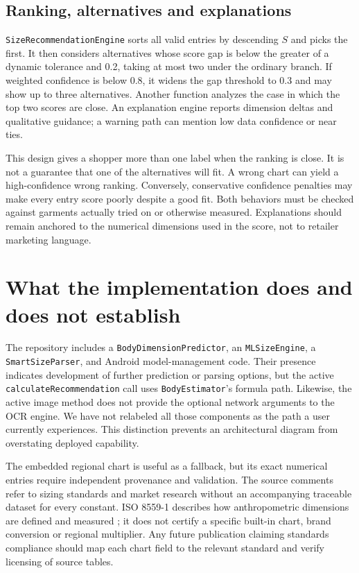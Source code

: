 \documentclass[11pt,a4paper]{article}
\begin{document}
\subsection{Ranking, alternatives and explanations}
\texttt{SizeRecommendationEngine} sorts all valid entries by descending $S$ and picks the first. It then considers alternatives whose score gap is below the greater of a dynamic tolerance and 0.2, taking at most two under the ordinary branch. If weighted confidence is below 0.8, it widens the gap threshold to 0.3 and may show up to three alternatives. Another function analyzes the case in which the top two scores are close. An explanation engine reports dimension deltas and qualitative guidance; a warning path can mention low data confidence or near ties.

This design gives a shopper more than one label when the ranking is close. It is not a guarantee that one of the alternatives will fit. A wrong chart can yield a high-confidence wrong ranking. Conversely, conservative confidence penalties may make every entry score poorly despite a good fit. Both behaviors must be checked against garments actually tried on or otherwise measured. Explanations should remain anchored to the numerical dimensions used in the score, not to retailer marketing language.

\section{What the implementation does and does not establish}
The repository includes a \texttt{BodyDimensionPredictor}, an \texttt{MLSizeEngine}, a \texttt{SmartSizeParser}, and Android model-management code. Their presence indicates development of further prediction or parsing options, but the active \texttt{calculateRecommendation} call uses \texttt{BodyEstimator}'s formula path. Likewise, the active image method does not provide the optional network arguments to the OCR engine. We have not relabeled all those components as the path a user currently experiences. This distinction prevents an architectural diagram from overstating deployed capability.

The embedded regional chart is useful as a fallback, but its exact numerical entries require independent provenance and validation. The source comments refer to sizing standards and market research without an accompanying traceable dataset for every constant. ISO 8559-1 describes how anthropometric dimensions are defined and measured \cite{iso8559}; it does not certify a specific built-in chart, brand conversion or regional multiplier. Any future publication claiming standards compliance should map each chart field to the relevant standard and verify licensing of source tables.
\end{document}
